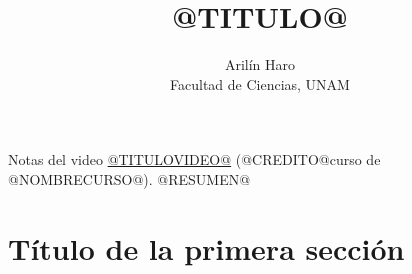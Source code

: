 \documentclass[11pt]{article}
\title{@TITULO@}
\author{Arilín Haro\\[2pt]\small Facultad de Ciencias, UNAM}
\date{}
\begin{document}
\maketitle

\noindent\small Notas del video
\href{https://www.youtube.com/watch?v=@VIDEOID@}{\guillemotleft{}@TITULOVIDEO@\guillemotright{}}
(@CREDITO@curso de @NOMBRECURSO@). @RESUMEN@
\normalsize

\section*{Título de la primera sección}

\end{document}
